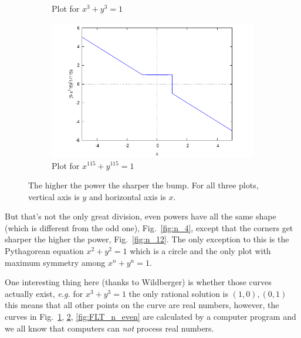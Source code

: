 \documentclass[aps,preprint,preprintnumbers,nofootinbib,showpacs,prd]{revtex4-1}
\newcommand{\eg}{{\it e.g.} }
\begin{document}
\begin{figure}
\begin{subfigure}{.33\textwidth}
  \caption{Plot for $x^3 + y^3 = 1$}
  \label{fig:n_3}
\end{subfigure}
\begin{subfigure}{.33\textwidth}
  \centering
  \includegraphics[width=1.1\linewidth]{FLT_n_115.png}
  \caption{Plot for $x^{115} + y^{115} = 1$}
  \label{fig:n_115}
\end{subfigure}
\caption{The higher the power the sharper the bump. For all three plots, vertical axis is $y$ and horizontal axis is $x$.}
\label{fig:FLT_n_odd}
\end{figure}
%

But that's not the only great division, even powers have all the same shape (which is different from the odd one), Fig.~\ref{fig:n_4}, except that the corners get sharper the higher the power, Fig.~\ref{fig:n_12}. The only exception to this is the Pythagorean equation $x^2 + y^2 = 1$ which is a circle and the only plot with maximum symmetry among $x^n + y^n = 1$.

One interesting thing here (thanks to Wildberger) is whether those curves actually exist, \eg for $x^3 + y^3 = 1$ the only rational solution is $(1,0), (0,1)$ this means that all other points on the curve are real numbers, however, the curves in Fig.~\ref{fig:n_3}, \ref{fig:n_115}, \ref{fig:FLT_n_even} are calculated by a computer program and we all know that computers can {\it not} process real numbers.
\end{document}

